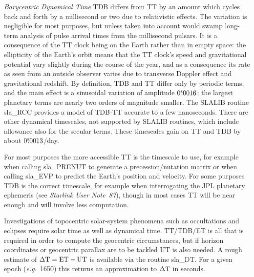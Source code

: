 \documentclass[11pt,twoside]{article}
\newcommand{\tseci}[1]   {$#1$\mbox{$^{\rm s}$}}
\newcommand{\tsec}[2]    {\tseci{#1}$\hspace{-0.3em}.#2$}
\renewcommand{\tsec}[2] {$#1^{\rm s}\hspace{-0.3em}.#2$}
\begin{document}
{\it Barycentric Dynamical Time}\/ TDB differs from TT by an amount which
cycles back and forth by a millisecond or two due to
relativistic effects.  The variation is
negligible for most purposes, but unless taken into
account would swamp
long-term analysis of pulse arrival times from the
millisecond pulsars.  It is a consequence of
the TT clock being on the Earth rather than in empty
space:  the ellipticity of
the Earth's orbit means that the TT clock's speed and
gravitational potential vary slightly
during the course of the year, and as a consequence
its rate as seen from an outside observer
varies due to transverse Doppler effect and gravitational
redshift.  By definition, TDB and TT differ only
by periodic terms, and the main effect
is a sinusoidal variation of amplitude \tsec{0}{0016};  the
largest planetary terms are nearly two orders of magnitude
smaller.  The SLALIB routine
sla\_RCC
provides a model of
TDB-TT accurate to a few nanoseconds.
There are other dynamical timescales, not supported by
SLALIB routines, which include allowance also for the secular terms.
These timescales gain on TT and TDB by about \tsec{0}{0013}/day.

For most purposes the more accessible TT is the timescale to use,
for example when calling
sla\_PRENUT
to generate a precession/nutation matrix or when calling
sla\_EVP
to predict the
Earth's position and velocity.  For some purposes TDB is the
correct timescale, for example when interrogating the JPL planetary
ephemeris (see {\it Starlink User Note~87}\/), though in most cases
TT will be near enough and will involve less computation.

Investigations of topocentric solar-system phenomena such as
occultations and eclipses require solar time as well as dynamical
time.  TT/TDB/ET is all that is required in order to compute the geocentric
circumstances, but if horizon coordinates or geocentric parallax
are to be tackled UT is also needed.  A rough estimate
of $\Delta {\rm T} = {\rm ET} - {\rm UT}$ is
available via the routine
sla\_DT.
For a given epoch ({\it e.g.}\ 1650) this returns an approximation
to $\Delta {\rm T}$ in seconds.
\end{document}
